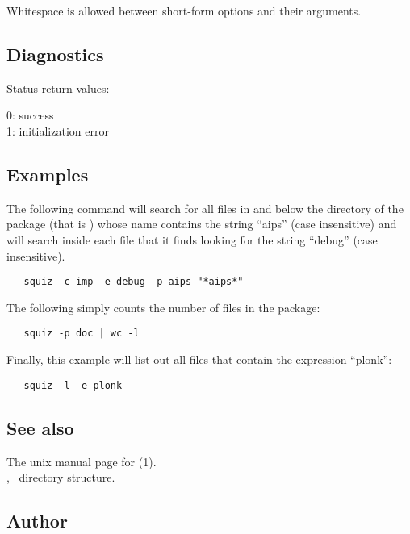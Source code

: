\noindent
Whitespace is allowed between short-form options and their arguments.

\subsection*{Diagnostics}

Status return values:
\begin{status}
   0:  success\\
   1:  initialization error
\end{status}

\subsection*{Examples}

The following command will search for all files in and below the
 directory of the  package (that is
) whose name contains the string ``aips'' (case
insensitive) and will search inside each file that it finds looking for the
string ``debug'' (case insensitive).

\begin{verbatim}
   squiz -c imp -e debug -p aips "*aips*"
\end{verbatim}

\noindent
The following simply counts the number of files in the  package:

\begin{verbatim}
   squiz -p doc | wc -l
\end{verbatim}

\noindent
Finally, this example will list out all files that contain the expression
``plonk'':

\begin{verbatim}
   squiz -l -e plonk
\end{verbatim}

\subsection*{See also}

The unix manual page for (1).\\
, \aipspp\ directory structure.

\subsection*{Author}


